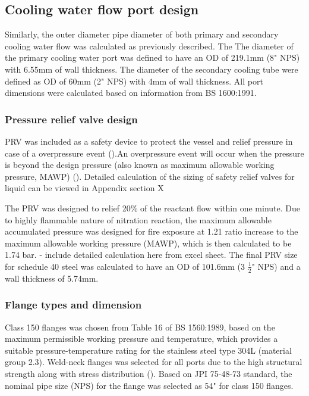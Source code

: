 \subsection{Cooling water flow port design}
Similarly, the outer diameter pipe diameter of both primary and secondary cooling water flow was calculated as previously described. The 
The diameter of the primary cooling water port was defined to have an OD of 219.1mm (8" NPS) with 6.55mm of wall thickness. The diameter of the secondary cooling tube were defined as OD of 60mm (2" NPS) with 4mm of wall thickness. All port dimensions were calculated based on information from BS 1600:1991. 


\subsubsection{Pressure relief valve design}
PRV was included as a safety device to protect the vessel and relief pressure in case of a overpressure event ().An overpressure event will occur when the pressure is beyond the design pressure (also known as maximum allowable working pressure, MAWP) (). Detailed calculation of the sizing of safety relief valves for liquid can be viewed in Appendix section X

The PRV was designed to relief 20\% of the reactant flow within one minute. Due to highly flammable nature of nitration reaction, the maximum allowable accumulated pressure was designed for fire exposure at 1.21 ratio increase to the maximum allowable working pressure (MAWP), which is then calculated to be 1.74 bar. 
- include detailed calculation here from excel sheet. 
The final PRV size for schedule 40 steel was calculated to have an OD of 101.6mm (3 $\frac{1}{2}$" NPS) and a wall thickness of 5.74mm.



\subsubsection{Flange types and dimension}
Class 150 flanges was chosen from Table 16 of BS 1560:1989, based on the maximum permissible working pressure and temperature, which provides a suitable pressure-temperature rating for the stainless steel type 304L (material group 2.3). Weld-neck flanges was selected for all ports due to the high structural strength along with stress distribution ().
Based on JPI 75-48-73 standard, the nominal pipe size (NPS) for the flange was selected as 54" for class 150 flanges.
